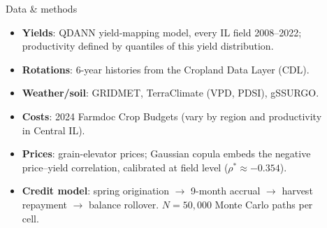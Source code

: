 \documentclass[final]{beamer}
\newlength{\sepwid}
\newlength{\onecolwid}
\newlength{\twocolwid}
\begin{document}
\begin{frame}[t]
\begin{columns}[t]
\begin{column}{\onecolwid}
\begin{block}{Data \& methods}
\begin{itemize}
  \item \textbf{Yields}: QDANN yield-mapping model, every IL field 2008--2022; productivity defined by quantiles of this yield distribution.
  \item \textbf{Rotations}: 6-year histories from the Cropland Data Layer (CDL).
  \item \textbf{Weather/soil}: GRIDMET, TerraClimate (VPD, PDSI), gSSURGO.
  \item \textbf{Costs}: 2024 Farmdoc Crop Budgets (vary by region and productivity in Central IL).
  \item \textbf{Prices}: grain-elevator prices; Gaussian copula embeds the negative price--yield correlation, calibrated at field level ($\rho^{*} \approx -0.354$).
  \item \textbf{Credit model}: spring origination $\rightarrow$ 9-month accrual $\rightarrow$ harvest repayment $\rightarrow$ balance rollover. $N = 50{,}000$ Monte Carlo paths per cell.
\end{itemize}
\end{block}

\end{column}

\begin{column}{\sepwid}\end{column}

\begin{column}{\twocolwid}

\begin{columns}[t,totalwidth=\twocolwid]

\begin{column}{\onecolwid}\vspace{-.6in}


\end{column}
\end{columns}
\end{column}
\end{columns}
\end{frame}
\end{document}
